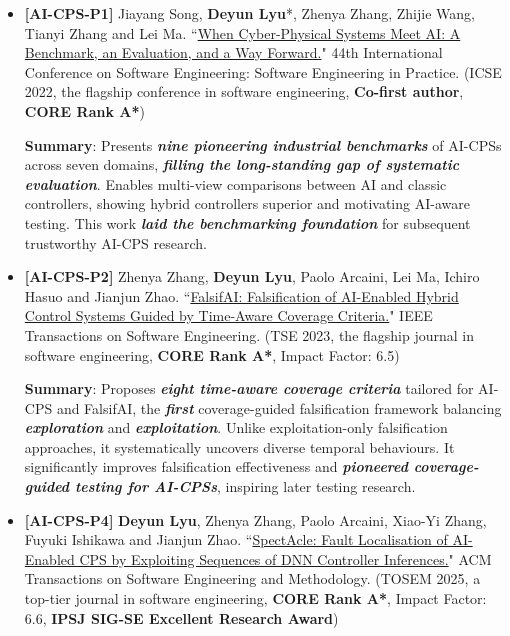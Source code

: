 \documentclass[11pt,a4paper]{moderncv}        %
\newcommand{\highlight}[1]{\textcolor{deepPurple}{\textbf{#1}}}
\newcommand{\strongit}[1]{\textbf{\textit{#1}}}
\begin{document}
\begin{itemize}
    \item \textbf{[AI-CPS-P1]} Jiayang Song, \textbf{Deyun Lyu}*, Zhenya Zhang, Zhijie Wang, Tianyi Zhang and Lei Ma. ``\href{https://dl.acm.org/doi/10.1145/3510457.3513049}{When Cyber-Physical Systems Meet AI: A Benchmark, an Evaluation, and a Way Forward.}" 44th International Conference on Software Engineering: Software Engineering in Practice. (ICSE 2022, the flagship conference in software engineering, \highlight{Co-first author}, \highlight{CORE Rank A*})
    
    \textbf{Summary}: Presents \strongit{nine pioneering industrial benchmarks} of AI-CPSs across seven domains, \strongit{filling the long-standing gap of systematic evaluation}. Enables multi-view comparisons between AI and classic controllers, showing hybrid controllers superior and motivating AI-aware testing. This work \strongit{laid the benchmarking foundation} for subsequent trustworthy AI-CPS research.
    \item \textbf{[AI-CPS-P2]} Zhenya Zhang, \textbf{Deyun Lyu}, Paolo Arcaini, Lei Ma, Ichiro Hasuo and Jianjun Zhao. ``\href{https://ieeexplore.ieee.org/document/9844247}{FalsifAI: Falsification of AI-Enabled Hybrid Control Systems Guided by Time-Aware Coverage Criteria.}" IEEE Transactions on Software Engineering. (TSE 2023, the flagship journal in software engineering, \highlight{CORE Rank A*}, Impact Factor: 6.5)

    \textbf{Summary}: Proposes \strongit{eight time-aware coverage criteria} tailored for AI-CPS and FalsifAI, the \strongit{first} coverage-guided falsification framework balancing \strongit{exploration} and \strongit{exploitation}. Unlike exploitation-only falsification approaches, it systematically uncovers diverse temporal behaviours. It significantly improves falsification effectiveness and \strongit{pioneered coverage-guided testing for AI-CPSs}, inspiring later testing research.
    \item \textbf{[AI-CPS-P4]} \textbf{Deyun Lyu}, Zhenya Zhang, Paolo Arcaini, Xiao-Yi Zhang, Fuyuki Ishikawa and Jianjun Zhao. ``\href{https://dl.acm.org/doi/10.1145/3705307}{SpectAcle: Fault Localisation of AI-Enabled CPS by Exploiting Sequences of DNN Controller Inferences.}" ACM Transactions on Software Engineering and Methodology. (TOSEM 2025, a top-tier journal in software engineering, \highlight{CORE Rank A*}, Impact Factor: 6.6, \highlight{IPSJ SIG-SE Excellent Research Award})
    

\end{itemize}
\end{document}
